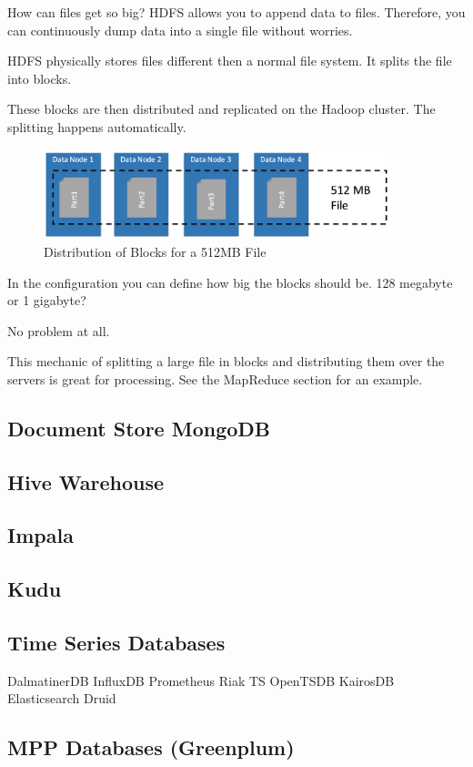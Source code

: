 \documentclass[12pt, numbers=noenddot]{scrreprt} %
\begin{document}
How can files get so big? HDFS allows you to append data to files. Therefore, you can continuously dump data into a single file without worries.

HDFS physically stores files different then a normal file system. It splits the file into blocks.

These blocks are then distributed and replicated on the Hadoop cluster. The splitting happens automatically.

\begin{figure}[htbp]
  \centering
     \includegraphics[width=0.9\textwidth]{images/HDFS-Distributed-FileSystem}
  \caption{Distribution of Blocks for a 512MB File}
  \label{fig:Bild1}
\end{figure}

In the configuration you can define how big the blocks should be. 128 megabyte or 1 gigabyte?

No problem at all.

This mechanic of splitting a large file in blocks and distributing them over the servers is great for processing.
See the MapReduce section for an example.

\subsection{Document Store MongoDB}
\subsection{Hive Warehouse}
\subsection{Impala}
\subsection{Kudu}

\subsection{Time Series Databases}
DalmatinerDB
InfluxDB
Prometheus
Riak TS
OpenTSDB
KairosDB
Elasticsearch
Druid
\subsection{MPP Databases (Greenplum)}
\end{document}
